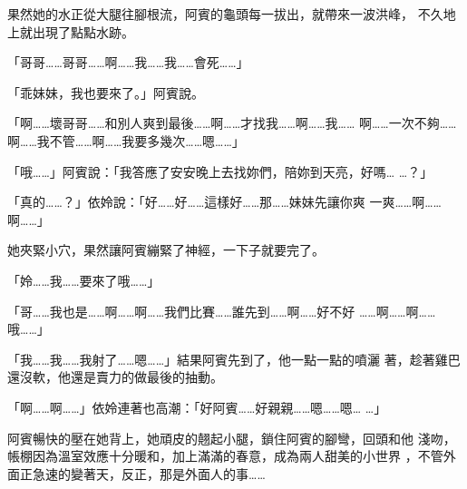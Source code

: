 果然她的水正從大腿往腳根流，阿賓的龜頭每一拔出，就帶來一波洪峰，
不久地上就出現了點點水跡。

「哥哥……哥哥……啊……我……我……會死……」

「乖妹妹，我也要來了。」阿賓說。

「啊……壞哥哥……和別人爽到最後……啊……才找我……啊……我……
啊……一次不夠……啊……我不管……啊……我要多幾次……嗯……」

「哦……」阿賓說：「我答應了安安晚上去找妳們，陪妳到天亮，好嗎…
…？」

「真的……？」依姈說：「好……好……這樣好……那……妹妹先讓你爽
一爽……啊……啊……」

她夾緊小穴，果然讓阿賓繃緊了神經，一下子就要完了。

「姈……我……要來了哦……」

「哥……我也是……啊……啊……我們比賽……誰先到……啊……好不好
……啊……啊……哦……」

「我……我……我射了……嗯……」結果阿賓先到了，他一點一點的噴灑
著，趁著雞巴還沒軟，他還是賣力的做最後的抽動。

「啊……啊……」依姈連著也高潮：「好阿賓……好親親……嗯……嗯…
…」

阿賓暢快的壓在她背上，她頑皮的翹起小腿，鎖住阿賓的腳彎，回頭和他
淺吻，帳棚因為溫室效應十分暖和，加上滿滿的春意，成為兩人甜美的小世界
，不管外面正急速的變著天，反正，那是外面人的事……










